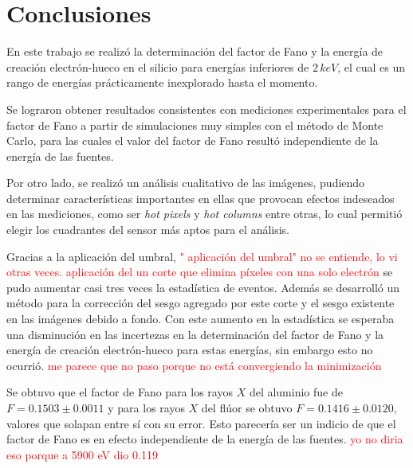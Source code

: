 \chapter{Conclusiones}
\noindent En este trabajo se realizó la determinación del factor de Fano y la energía de creación electrón-hueco en el silicio para energías inferiores de $2\,\si{keV}$, el cual es un rango de energías prácticamente inexplorado hasta el momento.


Se lograron obtener resultados consistentes con mediciones experimentales para el factor de Fano a partir de simulaciones muy simples con el método de Monte Carlo, para las cuales el valor del factor de Fano resultó independiente de la energía de las fuentes.

Por otro lado, se realizó un análisis cualitativo de las imágenes, pudiendo determinar características importantes en ellas que provocan efectos indeseados en las mediciones, como ser \textit{hot pixels} y \textit{hot columns} entre otras, lo cual permitió elegir los cuadrantes del sensor más aptos para el análisis.

Gracias a la aplicación del umbral, \textcolor{red}{" aplicación del umbral" no se entiende, lo vi otras veces. aplicación del un corte que elimina píxeles con una solo electrón} se pudo aumentar casi tres veces la estadística de eventos. Además se desarrolló un método para la corrección del sesgo agregado por este corte y el sesgo existente en las imágenes debido a fondo. Con este aumento en la estadística se esperaba una disminución en las incertezas en la determinación del factor de Fano y la energía de creación electrón-hueco para estas energías, sin embargo esto no ocurrió.
 \textcolor{red}{me parece que no paso porque no está convergiendo la minimización}

Se obtuvo que el factor de Fano para los rayos $X$ del aluminio fue de $F = 0.1503 \pm 0.0011$ y para los rayos $X$ del flúor se obtuvo $F = 0.1416 \pm 0.0120$, valores que solapan entre sí con su error. Esto parecería ser un indicio de que el factor de Fano es en efecto independiente de la energía de las fuentes.
 \textcolor{red}{yo no diria eso porque a 5900 eV dio 0.119}

